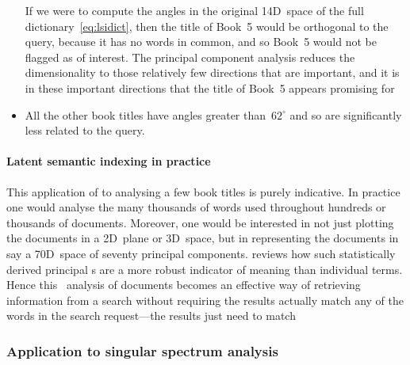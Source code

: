 \begin{reduce}
\begin{itemize}
If we were to compute the angles in the original 14D~space of the full dictionary~\eqref{eq:lsidict}, then the title of Book~5 would be orthogonal to the query, because it has no words in common, and so Book~5 would not be flagged as of interest.
The principal component analysis reduces the dimensionality to those relatively few directions that are important, and it is in these important directions that the title of Book~5 appears promising for 

\item All the other book titles have angles greater than~\(62^\circ\) and so are significantly less related to the query.
\end{itemize}



\paragraph{Latent semantic indexing in practice}
This application of  to analysing a few book titles is purely indicative.
In practice one would analyse the many thousands of words used throughout hundreds or thousands of documents. 
Moreover, one would be interested in not just plotting the documents in a 2D~plane or 3D~space, but in representing the documents in say a 70D~space of seventy principal components.
\cite{Berry95} reviews how such statistically derived principal s are a more robust indicator of meaning than individual terms.  
Hence this \svd\ analysis of documents becomes an effective way of retrieving information from a search without requiring the results actually match any of the words in the search request---the results just need to match 




\end{reduce}





\begin{reduce}
\begin{draft}
\subsubsection {Application to singular spectrum analysis}
\label{sec:ssa}

\end{draft}
\end{reduce}



